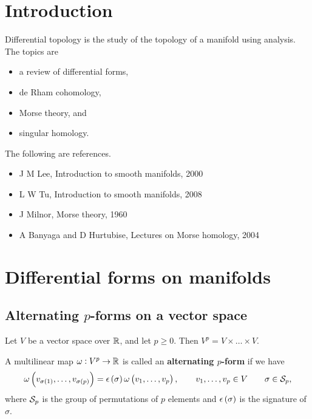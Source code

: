 \def\module{M4P54 Differential Topology}
\def\lecturer{Prof Paolo Cascini}
\def\term{Spring 2020}
\def\cover{}
\def\syllabus{}
\def\thm{section}







\section{Introduction}


Differential topology is the study of the topology of a manifold using analysis. The topics are
\begin{itemize}
\item a review of differential forms,
\item de Rham cohomology,
\item Morse theory, and
\item singular homology.
\end{itemize}
The following are references.
\begin{itemize}
\item J M Lee, Introduction to smooth manifolds, 2000
\item L W Tu, Introduction to smooth manifolds, 2008
\item J Milnor, Morse theory, 1960
\item A Banyaga and D Hurtubise, Lectures on Morse homology, 2004
\end{itemize}

\pagebreak

\section{Differential forms on manifolds}

\subsection{Alternating \texorpdfstring{$ p $}{p}-forms on a vector space}

Let $ V $ be a vector space over $ \mathbb{R} $, and let $ p \ge 0 $. Then $ V^p = V \times \dots \times V $.

\begin{definition}
A multilinear map $ \omega : V^p \to \mathbb{R} $ is called an \textbf{alternating $ p $-form} if we have
$$ \omega\br{v_{\sigma\br{1}}, \dots, v_{\sigma\br{p}}} = \epsilon\br{\sigma}\omega\br{v_1, \dots, v_p}, \qquad v_1, \dots, v_p \in V \qquad \sigma \in \SSS_p, $$
where $ \mathcal{S}_p $ is the group of permutations of $ p $ elements and $ \epsilon\br{\sigma} $ is the signature of $ \sigma $.
\end{definition}

